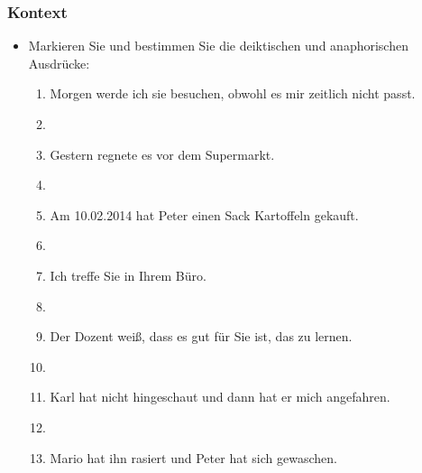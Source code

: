\begin{frame}
\frametitle{Kontext}

\begin{itemize}
	\item Markieren Sie und bestimmen Sie die deiktischen und anaphorischen Ausdrücke:
	
\vspace{5mm}
	
	\begin{enumerate}
	\item Morgen werde ich sie besuchen, obwohl es mir zeitlich nicht passt.
	\item[]
	\item Gestern regnete es vor dem Supermarkt.
	\item[]
	\item Am 10.02.2014 hat Peter einen Sack Kartoffeln gekauft.
	\item[]
	\item Ich treffe Sie in Ihrem Büro.
	\item[]
	\item Der Dozent wei\ss{}, dass es gut für Sie ist, das zu lernen.
	\item[]
	\item Karl hat nicht hingeschaut und dann hat er mich angefahren.
	\item[]
	\item Mario hat ihn rasiert und Peter hat sich gewaschen.
	\end{enumerate}
	
\end{itemize}

\end{frame}


